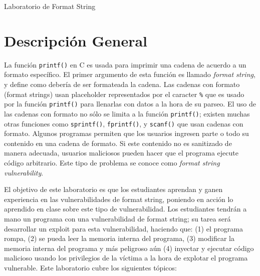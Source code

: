 
\newcommand{\commonfolder}{../../common-files}





\newcommand{\formatFigs}{./Figs}






\begin{center}
{\LARGE Laboratorio de Format String}
\end{center}




\section{Descripción General}

La función \texttt{printf()} en C es usada para imprimir una cadena de acuerdo a un formato específico. El primer argumento de esta función es llamado \textit{format string}, y define como debería de ser formateada la cadena. Las cadenas con formato (format strings) usan placeholder representados por el caracter \texttt{\%} que es usado por la función \texttt{printf()} para llenarlas con datos a la hora de su parseo. El uso de las cadenas con formato no sólo se limita a la función \texttt{printf()}; existen muchas otras funciones como \texttt{sprintf()}, \texttt{fprintf()}, y \texttt{scanf()} que usan cadenas con formato. Algunos programas permiten que los usuarios ingresen parte o todo su contenido en una cadena de formato. Si este contenido no es sanitizado de manera adecuada, usuarios maliciosos pueden hacer que el programa ejecute código arbitrario. Este tipo de problema se conoce como \textit{format string vulnerability}.

El objetivo de este laboratorio es que los estudiantes aprendan y ganen experiencia en las vulnerabilidades de format string, poniendo en acción lo aprendido en clase sobre este tipo de vulnerabilidad.
Los estudiantes tendrán a mano un programa con una vulnerabilidad de format string; su tarea será desarrollar un exploit para esta vulnerabilidad, haciendo que: (1) el programa rompa, (2) se pueda leer la memoria interna del programa, (3) modificar la memoria interna del programa y más peligroso aún (4) inyectar y ejecutar código malicioso usando los privilegios de la víctima a la hora de explotar el programa vulnerable.
Este laboratorio cubre los siguientes tópicos:



